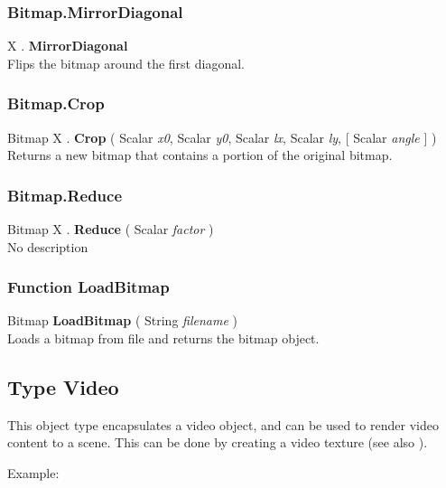 \subsubsection{Bitmap.MirrorDiagonal \label{F:Bitmap:MirrorDiagonal}}
X . \textbf{MirrorDiagonal} \\
Flips the bitmap around the first diagonal.

\subsubsection{Bitmap.Crop \label{F:Bitmap:Crop}}
Bitmap X . \textbf{Crop} ( Scalar \textit{x0}, Scalar \textit{y0}, Scalar \textit{lx}, Scalar \textit{ly},  [ Scalar \textit{angle} ] ) \\
Returns a new bitmap that contains a portion of the original bitmap.

\subsubsection{Bitmap.Reduce \label{F:Bitmap:Reduce}}
Bitmap X . \textbf{Reduce} ( Scalar \textit{factor} ) \\
No description

\subsubsection{Function LoadBitmap \label{F:LoadBitmap}}
Bitmap \textbf{LoadBitmap} ( String \textit{filename} ) \\
Loads a bitmap from file and returns the bitmap object.

\subsection{Type Video \label{T:Video}}
This object type encapsulates a video object, and can be used to render video content to a scene. This can be done by creating a video texture (see also ).

Example: \\

